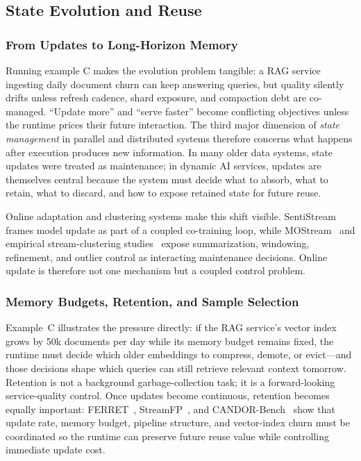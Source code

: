 \documentclass[manuscript,nonacm]{acmart}
\begin{document}
\subsection{State Evolution and Reuse}

\subsubsection{From Updates to Long-Horizon Memory}

Running example C makes the evolution problem tangible: a RAG service ingesting daily document churn can keep answering queries, but quality silently drifts unless refresh cadence, shard exposure, and compaction debt are co-managed. ``Update more'' and ``serve faster'' become conflicting objectives unless the runtime prices their future interaction. The third major dimension of \emph{state management} in parallel and distributed systems therefore concerns what happens after execution produces new information. In many older data systems, state updates were treated as maintenance; in dynamic AI services, updates are themselves central because the system must decide what to absorb, what to retain, what to discard, and how to expose retained state for future reuse.

Online adaptation and clustering systems make this shift visible. SentiStream~\cite{wu2023sentistream} frames model update as part of a coupled co-training loop, while MOStream~\cite{wang2024mostream} and empirical stream-clustering studies~\cite{wang2023dscstudy} expose summarization, windowing, refinement, and outlier control as interacting maintenance decisions. Online update is therefore not one mechanism but a coupled control problem.

\subsubsection{Memory Budgets, Retention, and Sample Selection}

Example~C illustrates the pressure directly: if the RAG service's vector index grows by 50k documents per day while its memory budget remains fixed, the runtime must decide which older embeddings to compress, demote, or evict---and those decisions shape which queries can still retrieve relevant context tomorrow. Retention is not a background garbage-collection task; it is a forward-looking service-quality control. Once updates become continuous, retention becomes equally important: FERRET~\cite{zhou2025ferret}, StreamFP~\cite{li2026streamfp}, and CANDOR-Bench~\cite{wang2026candor} show that update rate, memory budget, pipeline structure, and vector-index churn must be coordinated so the runtime can preserve future reuse value while controlling immediate update cost.
\end{document}
